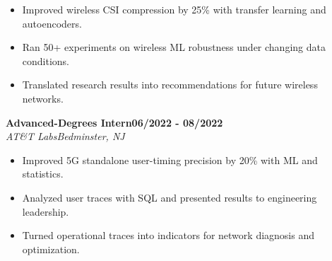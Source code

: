 \documentclass[9pt,letterpaper]{extarticle}
\newcommand{\role}[4]{%
  \Needspace{4\baselineskip}\textbf{#1}\hfill\textbf{#2}\\[-1pt]
  \textit{#3}\hfill\textit{#4}\par}
\begin{document}
\begin{itemize}
\item Improved wireless CSI compression by 25\% with transfer learning and autoencoders.
\item Ran 50+ experiments on wireless ML robustness under changing data conditions.
\item Translated research results into recommendations for future wireless networks.
\end{itemize}
\vspace{1pt}
\role{Advanced-Degrees Intern}{06/2022 - 08/2022}{AT\&T Labs}{Bedminster, NJ}
\begin{itemize}
\item Improved 5G standalone user-timing precision by 20\% with ML and statistics.
\item Analyzed user traces with SQL and presented results to engineering leadership.
\item Turned operational traces into indicators for network diagnosis and optimization.
\end{itemize}
\vspace{1pt}
\end{document}
